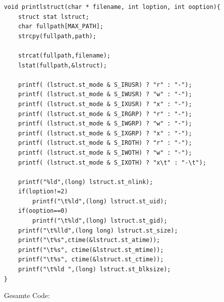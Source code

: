 \begin{itemize}
\begin{lstlisting}
void printlstruct(char * filename, int loption, int ooption){
	struct stat lstruct;
	char fullpath[MAX_PATH];
	strcpy(fullpath,path);

	strcat(fullpath,filename);
	lstat(fullpath,&lstruct);

	printf( (lstruct.st_mode & S_IRUSR) ? "r" : "-");
	printf( (lstruct.st_mode & S_IWUSR) ? "w" : "-");
	printf( (lstruct.st_mode & S_IXUSR) ? "x" : "-");
	printf( (lstruct.st_mode & S_IRGRP) ? "r" : "-");
	printf( (lstruct.st_mode & S_IWGRP) ? "w" : "-");
	printf( (lstruct.st_mode & S_IXGRP) ? "x" : "-");
	printf( (lstruct.st_mode & S_IROTH) ? "r" : "-");
	printf( (lstruct.st_mode & S_IWOTH) ? "w" : "-");
	printf( (lstruct.st_mode & S_IXOTH) ? "x\t" : "-\t");

	printf("%ld",(long) lstruct.st_nlink);
	if(loption!=2)
		printf("\t%ld",(long) lstruct.st_uid);
	if(ooption==0)
		printf("\t%ld",(long) lstruct.st_gid);
	printf("\t%lld",(long long) lstruct.st_size);
	printf("\t%s",ctime(&lstruct.st_atime));
	printf("\t%s", ctime(&lstruct.st_mtime));
	printf("\t%s", ctime(&lstruct.st_ctime));
	printf("\t%ld ",(long) lstruct.st_blksize);
}
\end{lstlisting}

\end{itemize}
Gesamte Code:
